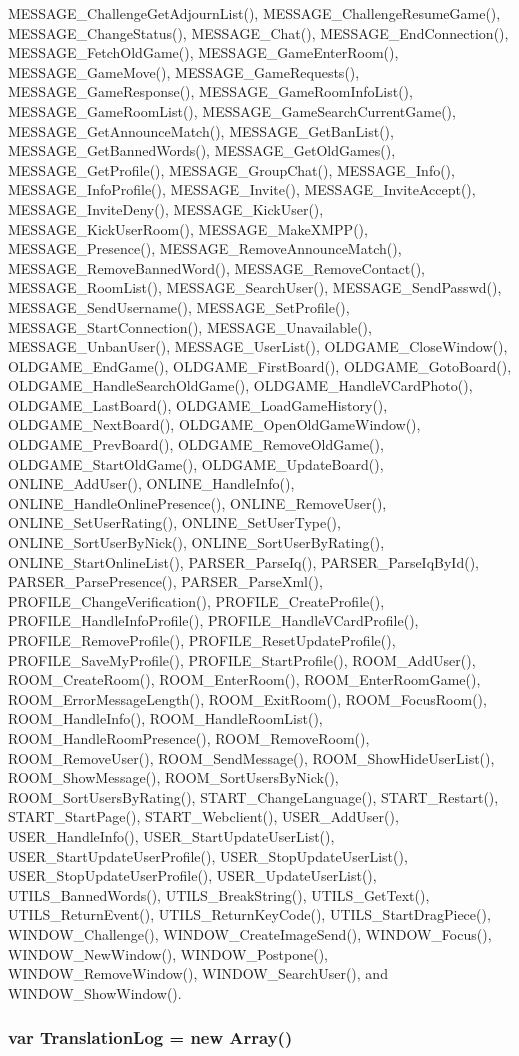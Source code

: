 MESSAGE\_\-ChallengeGetAdjournList(), MESSAGE\_\-ChallengeResumeGame(), MESSAGE\_\-ChangeStatus(), MESSAGE\_\-Chat(), MESSAGE\_\-EndConnection(), MESSAGE\_\-FetchOldGame(), MESSAGE\_\-GameEnterRoom(), MESSAGE\_\-GameMove(), MESSAGE\_\-GameRequests(), MESSAGE\_\-GameResponse(), MESSAGE\_\-GameRoomInfoList(), MESSAGE\_\-GameRoomList(), MESSAGE\_\-GameSearchCurrentGame(), MESSAGE\_\-GetAnnounceMatch(), MESSAGE\_\-GetBanList(), MESSAGE\_\-GetBannedWords(), MESSAGE\_\-GetOldGames(), MESSAGE\_\-GetProfile(), MESSAGE\_\-GroupChat(), MESSAGE\_\-Info(), MESSAGE\_\-InfoProfile(), MESSAGE\_\-Invite(), MESSAGE\_\-InviteAccept(), MESSAGE\_\-InviteDeny(), MESSAGE\_\-KickUser(), MESSAGE\_\-KickUserRoom(), MESSAGE\_\-MakeXMPP(), MESSAGE\_\-Presence(), MESSAGE\_\-RemoveAnnounceMatch(), MESSAGE\_\-RemoveBannedWord(), MESSAGE\_\-RemoveContact(), MESSAGE\_\-RoomList(), MESSAGE\_\-SearchUser(), MESSAGE\_\-SendPasswd(), MESSAGE\_\-SendUsername(), MESSAGE\_\-SetProfile(), MESSAGE\_\-StartConnection(), MESSAGE\_\-Unavailable(), MESSAGE\_\-UnbanUser(), MESSAGE\_\-UserList(), OLDGAME\_\-CloseWindow(), OLDGAME\_\-EndGame(), OLDGAME\_\-FirstBoard(), OLDGAME\_\-GotoBoard(), OLDGAME\_\-HandleSearchOldGame(), OLDGAME\_\-HandleVCardPhoto(), OLDGAME\_\-LastBoard(), OLDGAME\_\-LoadGameHistory(), OLDGAME\_\-NextBoard(), OLDGAME\_\-OpenOldGameWindow(), OLDGAME\_\-PrevBoard(), OLDGAME\_\-RemoveOldGame(), OLDGAME\_\-StartOldGame(), OLDGAME\_\-UpdateBoard(), ONLINE\_\-AddUser(), ONLINE\_\-HandleInfo(), ONLINE\_\-HandleOnlinePresence(), ONLINE\_\-RemoveUser(), ONLINE\_\-SetUserRating(), ONLINE\_\-SetUserType(), ONLINE\_\-SortUserByNick(), ONLINE\_\-SortUserByRating(), ONLINE\_\-StartOnlineList(), PARSER\_\-ParseIq(), PARSER\_\-ParseIqById(), PARSER\_\-ParsePresence(), PARSER\_\-ParseXml(), PROFILE\_\-ChangeVerification(), PROFILE\_\-CreateProfile(), PROFILE\_\-HandleInfoProfile(), PROFILE\_\-HandleVCardProfile(), PROFILE\_\-RemoveProfile(), PROFILE\_\-ResetUpdateProfile(), PROFILE\_\-SaveMyProfile(), PROFILE\_\-StartProfile(), ROOM\_\-AddUser(), ROOM\_\-CreateRoom(), ROOM\_\-EnterRoom(), ROOM\_\-EnterRoomGame(), ROOM\_\-ErrorMessageLength(), ROOM\_\-ExitRoom(), ROOM\_\-FocusRoom(), ROOM\_\-HandleInfo(), ROOM\_\-HandleRoomList(), ROOM\_\-HandleRoomPresence(), ROOM\_\-RemoveRoom(), ROOM\_\-RemoveUser(), ROOM\_\-SendMessage(), ROOM\_\-ShowHideUserList(), ROOM\_\-ShowMessage(), ROOM\_\-SortUsersByNick(), ROOM\_\-SortUsersByRating(), START\_\-ChangeLanguage(), START\_\-Restart(), START\_\-StartPage(), START\_\-Webclient(), USER\_\-AddUser(), USER\_\-HandleInfo(), USER\_\-StartUpdateUserList(), USER\_\-StartUpdateUserProfile(), USER\_\-StopUpdateUserList(), USER\_\-StopUpdateUserProfile(), USER\_\-UpdateUserList(), UTILS\_\-BannedWords(), UTILS\_\-BreakString(), UTILS\_\-GetText(), UTILS\_\-ReturnEvent(), UTILS\_\-ReturnKeyCode(), UTILS\_\-StartDragPiece(), WINDOW\_\-Challenge(), WINDOW\_\-CreateImageSend(), WINDOW\_\-Focus(), WINDOW\_\-NewWindow(), WINDOW\_\-Postpone(), WINDOW\_\-RemoveWindow(), WINDOW\_\-SearchUser(), and WINDOW\_\-ShowWindow().
\subsubsection[TranslationLog]{\setlength{\rightskip}{0pt plus 5cm}var {\bf TranslationLog} = new Array()}\label{start_8js_d4057b977a01abfa4f10098f1ffed0f1}


